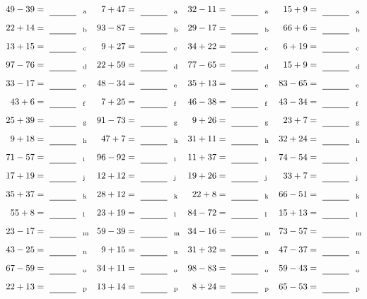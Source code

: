 \documentclass
[
  draft    = true,
  fontsize = 11pt,
  parskip  = half-
]
{scrartcl}
\begin{document}
\clearpage
\begin{align*}
    \pline{49-39}&=\rline{a}
  & \pline{7+47}&=\rline{a}
  & \pline{32-11}&=\rline{a}
  & \pline{15+9}&=\rline{a} \\[1ex]
    \pline{22+14}&=\rline{b}
  & \pline{93-87}&=\rline{b}
  & \pline{29-17}&=\rline{b}
  & \pline{66+6}&=\rline{b} \\[1ex]
    \pline{13+15}&=\rline{c}
  & \pline{9+27}&=\rline{c}
  & \pline{34+22}&=\rline{c}
  & \pline{6+19}&=\rline{c} \\[1ex]
    \pline{97-76}&=\rline{d}
  & \pline{22+59}&=\rline{d}
  & \pline{77-65}&=\rline{d}
  & \pline{15+9}&=\rline{d} \\[1ex]
    \pline{33-17}&=\rline{e}
  & \pline{48-34}&=\rline{e}
  & \pline{35+13}&=\rline{e}
  & \pline{83-65}&=\rline{e} \\[1ex]
    \pline{43+6}&=\rline{f}
  & \pline{7+25}&=\rline{f}
  & \pline{46-38}&=\rline{f}
  & \pline{43-34}&=\rline{f} \\[1ex]
    \pline{25+39}&=\rline{g}
  & \pline{91-73}&=\rline{g}
  & \pline{9+26}&=\rline{g}
  & \pline{23+7}&=\rline{g} \\[1ex]
    \pline{9+18}&=\rline{h}
  & \pline{47+7}&=\rline{h}
  & \pline{31+11}&=\rline{h}
  & \pline{32+24}&=\rline{h} \\[1ex]
    \pline{71-57}&=\rline{i}
  & \pline{96-92}&=\rline{i}
  & \pline{11+37}&=\rline{i}
  & \pline{74-54}&=\rline{i} \\[1ex]
    \pline{17+19}&=\rline{j}
  & \pline{12+12}&=\rline{j}
  & \pline{19+26}&=\rline{j}
  & \pline{33+7}&=\rline{j} \\[1ex]
    \pline{35+37}&=\rline{k}
  & \pline{28+12}&=\rline{k}
  & \pline{22+8}&=\rline{k}
  & \pline{66-51}&=\rline{k} \\[1ex]
    \pline{55+8}&=\rline{l}
  & \pline{23+19}&=\rline{l}
  & \pline{84-72}&=\rline{l}
  & \pline{15+13}&=\rline{l} \\[1ex]
    \pline{23-17}&=\rline{m}
  & \pline{59-39}&=\rline{m}
  & \pline{34-16}&=\rline{m}
  & \pline{73-57}&=\rline{m} \\[1ex]
    \pline{43-25}&=\rline{n}
  & \pline{9+15}&=\rline{n}
  & \pline{31+32}&=\rline{n}
  & \pline{47-37}&=\rline{n} \\[1ex]
    \pline{67-59}&=\rline{o}
  & \pline{34+11}&=\rline{o}
  & \pline{98-83}&=\rline{o}
  & \pline{59-43}&=\rline{o} \\[1ex]
    \pline{22+13}&=\rline{p}
  & \pline{13+14}&=\rline{p}
  & \pline{8+24}&=\rline{p}
  & \pline{65-53}&=\rline{p}
\end{align*}
\end{document}

